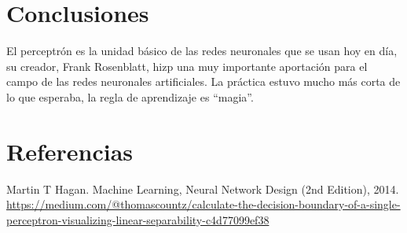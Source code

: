 \documentclass{article}
\begin{document}
\section{Conclusiones}
El perceptrón es la unidad básico de las redes neuronales que se usan hoy en día, su creador,  Frank Rosenblatt,  hizp una muy importante aportación para el campo de las redes neuronales artificiales. 
La práctica estuvo mucho más corta de lo que esperaba, la regla de aprendizaje es ``magia''. 
\section{Referencias}
Martin T Hagan. Machine Learning, Neural Network Design (2nd Edition), 2014.\\
\url{https://medium.com/@thomascountz/calculate-the-decision-boundary-of-a-single-perceptron-visualizing-linear-separability-c4d77099ef38}
\end{document}
